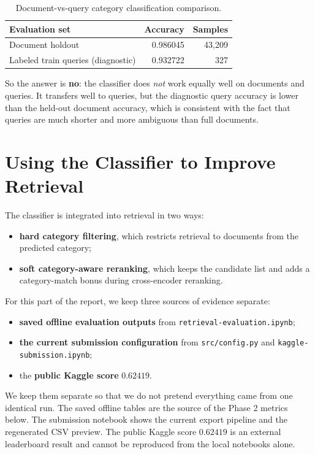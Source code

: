 \documentclass[11pt,a4paper]{article}
\begin{document}
\begin{table}[H]
\centering
\small
\begin{tabular}{l r r}
\toprule
Evaluation set & Accuracy & Samples \\
\midrule
Document holdout & 0.986045 & 43,209 \\
Labeled train queries (diagnostic) & 0.932722 & 327 \\
\bottomrule
\end{tabular}
\caption{Document-vs-query category classification comparison.}
\label{tab:docquerycompare}
\end{table}

So the answer is \textbf{no}: the classifier does \emph{not} work equally well on documents and queries. It transfers well to queries, but the diagnostic query accuracy is lower than the held-out document accuracy, which is consistent with the fact that queries are much shorter and more ambiguous than full documents.

\section{Using the Classifier to Improve Retrieval}

The classifier is integrated into retrieval in two ways:
\begin{itemize}
    \item \textbf{hard category filtering}, which restricts retrieval to documents from the predicted category;
    \item \textbf{soft category-aware reranking}, which keeps the candidate list and adds a category-match bonus during cross-encoder reranking.
\end{itemize}

For this part of the report, we keep three sources of evidence separate:

\begin{itemize}
    \item \textbf{saved offline evaluation outputs} from \texttt{retrieval-evaluation.ipynb};
    \item \textbf{the current submission configuration} from \texttt{src/config.py} and \texttt{kaggle-submission.ipynb};
    \item the \textbf{public Kaggle score} \(0.62419\).
\end{itemize}

We keep them separate so that we do not pretend everything came from one identical run. The saved offline tables are the source of the Phase 2 metrics below. The submission notebook shows the current export pipeline and the regenerated CSV preview. The public Kaggle score \(0.62419\) is an external leaderboard result and cannot be reproduced from the local notebooks alone.
\end{document}

